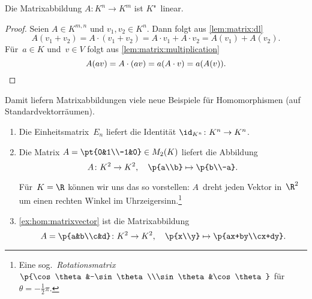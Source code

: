 \documentclass[a4paper]{article}
\begin{document}
\begin{lemma}
    Die Matrixabbildung $A\colon K^n \to K^m$ ist $K$"~linear.
\end{lemma}

\begin{proof}
    Seien $A \in K^{m,n}$ und $v_1,v_2 \in K^n$. Dann folgt aus \cref{lem:matrix:dl}
    \begin{equation*}
        A(v_1+v_2) = A \cdot (v_1+v_2) = A\cdot v_1 + A\cdot v_2 = A(v_1)+A(v_2).
    \end{equation*}
    Für~$a \in K$ und~$v \in V$ folgt aus \cref{lem:matrix:multiplication}
    \begin{equation*}
        A(av) = A \cdot (av) = a(A\cdot v) = a(A(v)). \qedhere
    \end{equation*}
\end{proof}

Damit liefern Matrixabbildungen viele neue Beispiele für Homomorphismen (auf Standardvektorräumen).

\begin{example}\leavevmode
    \begin{enumerate}
        \item Die Einheitsmatrix~$E_n$ liefert die Identität $\id_{K^n}\colon K^n \to K^n$.
        \item Die Matrix $A = \pt{0&1\\-1&0} \in M_2(K)$ liefert die Abbildung
        \begin{equation*}
            A\colon K^2 \to K^2,\quad \p{a\\b} \mapsto \p{b\\-a}.
        \end{equation*}

        Für~$K = \R$ können wir uns das so vorstellen: $A$~dreht jeden Vektor in~$\R^2$ um einen rechten Winkel im Uhrzeigersinn.\footnote{Eine sog.\ \emph{Rotationsmatrix} $\p{\cos\theta&-\sin\theta\\\sin\theta&\cos\theta}$ für~$\theta = -\frac{1}{2}\pi$.}
        \item \cref{ex:hom:matrixvector} ist die Matrixabbildung
        \begin{equation*}
            A = \p{a&b\\c&d}\colon K^2 \to K^2,\quad \p{x\\y} \mapsto \p{ax+by\\cx+dy}.
        \end{equation*}
    \end{enumerate}
\end{example}
\end{document}
